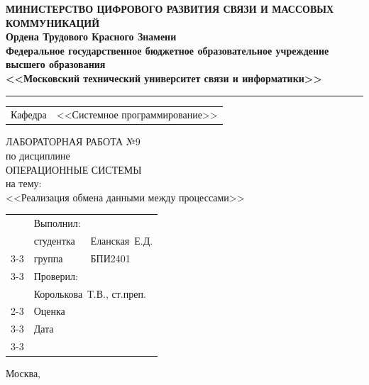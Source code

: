 \thispagestyle{empty}

\begin{center}
	\textbf{МИНИСТЕРСТВО ЦИФРОВОГО РАЗВИТИЯ СВЯЗИ И МАССОВЫХ КОММУНИКАЦИЙ} \\
	\textbf{Ордена Трудового Красного Знамени \\
		Федеральное государственное бюджетное образовательное учреждение высшего образования \\
		<<Московский технический университет связи и информатики>>}
\end{center}
\rule{\linewidth}{1pt}

\vspace{0.3em}

\begin{center}
	\begin{tabularx}{0.6\textwidth}{p{1.2cm}X}
		Кафедра & \quad <<Системное программирование>> \\%
	\end{tabularx}
\end{center}

\vspace{10em}

\begin{center}
	\Large
	ЛАБОРАТОРНАЯ РАБОТА №9 \\
	\large
	по дисциплине \\
	ОПЕРАЦИОННЫЕ СИСТЕМЫ \\
	на тему: \\
	<<Реализация обмена данными между процессами>>
\end{center}

\vspace{4em}

\renewcommand{\arraystretch}{1.1}
\begin{tabularx}{\textwidth}{p{10cm}p{2cm}p{3cm}}
	& Выполнил: & \\
	& студентка & Еланская~Е.Д. \\\cline{3-3} 
	& группа & БПИ2401 \\\cline{3-3} 
	& Проверил: &  \\
	& \multicolumn{2}{l}{Королькова~Т.В., ст.преп.} \\\cline{2-3}
	& Оценка & \\\cline{3-3} 
	& Дата & \\\cline{3-3} 
\end{tabularx}

\vspace{5em}

\begin{center}
	Москва,~\the\year
\end{center}
\clearpage

